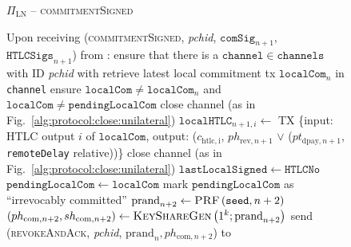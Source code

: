   \begin{figure}[H]
    \begin{protocolbox}{$\Pi_{\mathrm{LN}}$ -- \textsc{commitmentSigned}}
      \begin{algorithmic}[1]
        \State Upon receiving (\textsc{commitmentSigned}, \textit{pchid},
        $\mathtt{comSig}_{n+1}$, $\mathtt{HTLCSigs}_{n+1}$) from \bob:
        \Indent
          \State ensure that there is a $\mathtt{channel} \in \mathtt{channels}$
          with ID \textit{pchid} with \bob
          \State retrieve latest local commitment tx $\mathtt{localCom}_n$ in
          \texttt{channel}
          \State ensure $\mathtt{localCom} \neq \mathtt{localCom}_n$ and
          $\mathtt{localCom} \neq \mathtt{pendingLocalCom}$
            \State close channel (as in Fig.~\ref{alg:protocol:close:unilateral})
            \State \Return
          \EndIf
            \State $\mathtt{localHTLC}_{n+1, i} \gets$ TX \{input: HTLC output
            $i$ of $\mathtt{localCom}$, output: ($c_{\mathrm{htlc, i}}$,
            $ph_{\mathrm{rev}, n+1}$ $\vee$ ($pt_{\mathrm{dpay}, n+1}$,
            \texttt{remoteDelay} relative))\}
              \State close channel (as in
              Fig.~\ref{alg:protocol:close:unilateral})
              \State \Return
            \EndIf
          \EndFor
          \State $\mathtt{lastLocalSigned} \gets \mathtt{HTLCNo}$
          \State $\mathtt{pendingLocalCom} \gets \mathtt{localCom}$
          \State mark $\mathtt{pendingLocalCom}$ as ``irrevocably committed''
          \State $\mathrm{prand}_{n+2} \gets \textsc{PRF}\left(\mathtt{seed},
          n+2\right)$
          \label{alg:protocol:pay:commitmentSigned:prf}
          \State $\left(ph_{\mathrm{com}, n+2}, sh_{\mathrm{com}, n+2}\right)
          \gets \textsc{KeyShareGen}\left(1^k; \mathrm{prand}_{n+2}\right)$
          \State send (\textsc{revokeAndAck}, \textit{pchid}, $\mathrm{prand}_n,
          ph_{\mathrm{com}, n+2}$) to \bob
        \EndIndent
      \end{algorithmic}
    \end{protocolbox}
    \caption{}
    \label{alg:protocol:pay:commitmentSigned}
  \end{figure}

